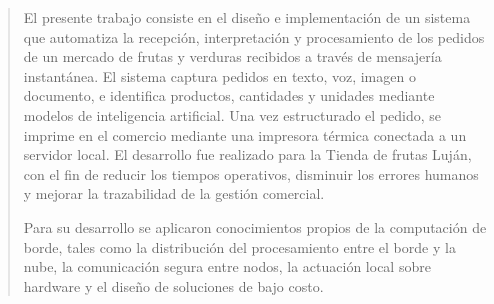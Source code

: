 \documentclass[
    11pt,
    spanish,
    singlespacing,
    parskip,
    headsepline,
    bookmarks=true,
    unicode=true,
    pdftoolbar=true,
    pdfmenubar=true,
    pdffitwindow=false,
    colorlinks=true,
    linkcolor=blue,
    citecolor=blue,
    urlcolor=blue
]{MastersDoctoralThesis}
\begin{document}



\frontmatter %
\pagestyle{plain} %


\begin{abstract}
    \addchaptertocentry{\abstractname}
    El presente trabajo consiste en el diseño e implementación de un sistema que automatiza la recepción, interpretación y procesamiento de los pedidos de un mercado de frutas y verduras recibidos a través de mensajería instantánea. El sistema captura pedidos en texto, voz, imagen o documento, e identifica productos, cantidades y unidades mediante modelos de inteligencia artificial. Una vez estructurado el pedido, se imprime en el comercio mediante una impresora térmica conectada a un servidor local. El desarrollo fue realizado para la Tienda de frutas Luján, con el fin de reducir los tiempos operativos, disminuir los errores humanos y mejorar la trazabilidad de la gestión comercial.

    Para su desarrollo se aplicaron conocimientos propios de la computación de borde, tales como la distribución del procesamiento entre el borde y la nube, la comunicación segura entre nodos, la actuación local sobre hardware y el diseño de soluciones de bajo costo.
\end{abstract}

\end{document}

